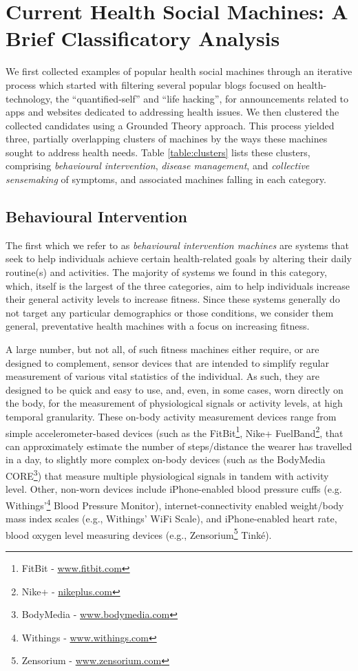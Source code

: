 \documentclass{sig-alternate}
\begin{document}
\section{Current Health Social Machines: A Brief Classificatory Analysis}

We first collected examples of popular health social machines through
an iterative process which started with filtering several popular blogs
focused on health-technology, the ``quantified-self'' and ``life
hacking'', for announcements related to apps and websites dedicated to
addressing health issues. We then clustered the collected candidates
using a Grounded Theory approach.  This process yielded three,
partially overlapping clusters of machines by the ways these machines
sought to address health needs.  Table \ref{table:clusters} lists these
clusters, comprising \emph{behavioural intervention}, \emph{disease
  management}, and \emph{collective sensemaking} of symptoms, and
associated machines falling in each category.

\subsection{Behavioural Intervention}

The first which we refer to as \emph{behavioural intervention
  machines} are systems that seek to help individuals achieve certain
health-related goals by altering their daily routine(s) and
activities.  The majority of systems we found in this category, which,
itself is the largest of the three categories, aim to help individuals
increase their general activity levels to increase fitness.  Since
these systems generally do not target any particular demographics or
those conditions, we consider them general, preventative health
machines with a focus on increasing fitness.

A large number, but not all, of such fitness machines either require,
or are designed to complement, sensor devices that are intended to
simplify regular measurement of various vital statistics of the
individual.  As such, they are designed to be quick and easy to use,
and, even, in some cases, worn directly on the body, for the
measurement of physiological signals or activity levels, at high
temporal granularity. These on-body activity measurement devices range
from simple accelerometer-based devices (such as the
FitBit\footnote{FitBit - \url{www.fitbit.com}}, Nike+ FuelBand\footnote{Nike+ -
  \url{nikeplus.com}}, that can approximately estimate the number of
steps/distance the wearer has travelled in a day, to slightly more
complex on-body devices (such as the BodyMedia CORE\footnote{BodyMedia
  - \url{www.bodymedia.com}}) that measure multiple physiological
signals in tandem with activity level.  Other, non-worn devices
include iPhone-enabled blood pressure cuffs
(e.g. Withings'\footnote{Withings - \url{www.withings.com}} Blood
Pressure Monitor), internet-connectivity enabled weight/body mass
index scales (e.g., Withings' WiFi Scale), and iPhone-enabled heart
rate, blood oxygen level measuring devices (e.g.,
Zensorium\footnote{Zensorium - \url{www.zensorium.com}} Tink\'{e}).
\end{document}

